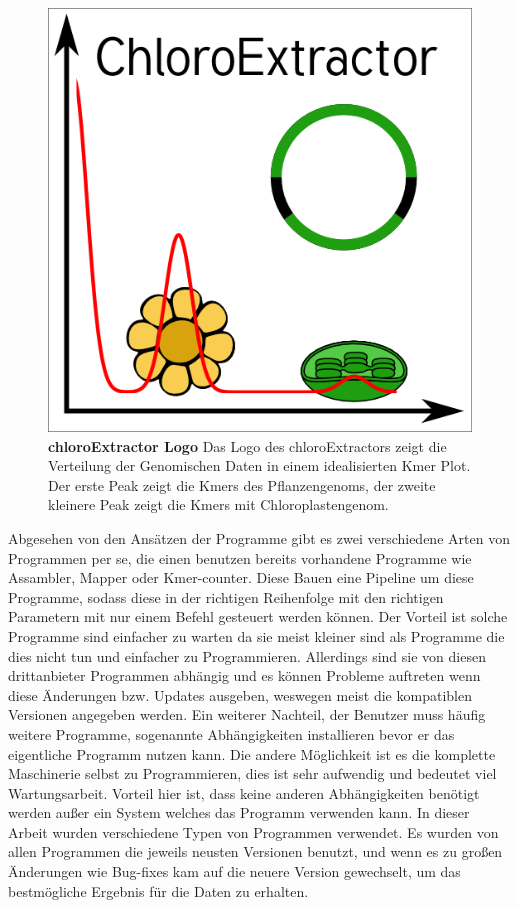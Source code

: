 \documentclass{scrartcl}
\begin{document}
\begin{figure}
\includegraphics[width=.6\linewidth]{./logo512.png}
\caption[chloroExtractor Logo]{\textbf{chloroExtractor Logo} Das Logo des chloroExtractors zeigt die Verteilung der Genomischen Daten in einem idealisierten Kmer Plot. Der erste Peak zeigt die Kmers des Pflanzengenoms, der zweite kleinere Peak zeigt die Kmers mit Chloroplastengenom.}
\end{figure}
Abgesehen von den Ansätzen der Programme gibt es zwei verschiedene Arten von Programmen per se, die einen benutzen bereits vorhandene Programme wie Assambler, Mapper oder Kmer-counter. Diese 
Bauen eine Pipeline um diese Programme, sodass diese in der richtigen Reihenfolge mit den richtigen Parametern mit nur einem Befehl gesteuert werden können. Der Vorteil ist solche Programme
sind einfacher zu warten da sie meist kleiner sind als Programme die dies nicht tun und einfacher zu Programmieren. Allerdings sind sie von diesen drittanbieter Programmen abhängig und es können Probleme 
auftreten wenn diese Änderungen bzw. Updates ausgeben, weswegen meist die kompatiblen Versionen angegeben werden. Ein weiterer Nachteil, der Benutzer muss häufig weitere Programme, sogenannte Abhängigkeiten installieren
bevor er das eigentliche Programm nutzen kann. Die andere Möglichkeit ist es die komplette Maschinerie selbst zu Programmieren, dies ist sehr aufwendig und bedeutet viel Wartungsarbeit. Vorteil hier
ist, dass keine anderen Abhängigkeiten benötigt werden außer ein System welches das Programm verwenden kann. In dieser Arbeit wurden verschiedene Typen von Programmen verwendet.
Es wurden von allen Programmen die jeweils neusten Versionen benutzt, und wenn es zu großen Änderungen wie Bug-fixes kam auf die neuere Version gewechselt, um das bestmögliche Ergebnis für die Daten
zu erhalten.
\end{document}
